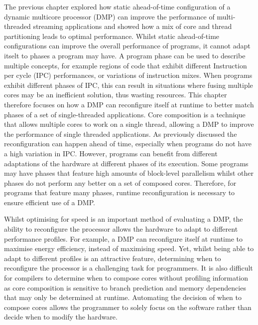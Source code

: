 The previous chapter explored how static ahead-of-time configuration of a dynamic multicore processor (DMP) can improve the performance of multi-threaded streaming applications and showed how a mix of core and thread partitioning leads to optimal performance.
Whilst static ahead-of-time configurations can improve the overall performance of programs, it cannot adapt itselt to phases a program may have.
A program phase can be used to describe multiple concepts, for example regions of code that exhibit different Instruction per cycle (IPC) performances, or variations of instruction mixes.
When programs exhibit different phases of IPC, this can result in situations where fusing multiple cores may be an inefficient solution, thus wasting resources.
This chapter therefore focuses on how a DMP can reconfigure itself at runtime to better match phases of a set of single-threaded applications.
Core composition is a technique that allows multiple cores to work on a single thread, allowing a DMP to improve the performance of single threaded applications.
As previously discussed the reconfiguration can happen ahead of time, especially when programs do not have a high variation in IPC.
However, programs can benefit from different adaptations of the hardware at different phases of its execution.
Some programs may have phases that feature high amounts of block-level parallelism whilst other phases do not perform any better on a set of composed cores.
Therefore, for programs that feature many phases, runtime reconfiguration is necessary to ensure efficient use of a DMP.

Whilst optimising for speed is an important method of evaluating a DMP, the ability to reconfigure the processor allows the hardware to adapt to different performance profiles.
For example, a DMP can reconfigure itself at runtime to maximise energy efficiency, instead of maximising speed.
Yet, whilst being able to adapt to different profiles is an attractive feature, determining when to reconfigure the processor is a challenging task for programmers.
It is also difficult for compilers to determine when to compose cores without profiling information as core composition is sensitive to branch prediction and memory dependencies that may only be determined at runtime.%
Automating the decision of when to compose cores allows the programmer to solely focus on the software rather than decide when to modify the hardware.

